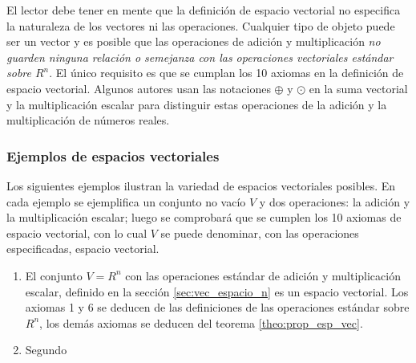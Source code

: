 \documentclass[a4paper,12pt]{article}
\begin{document}
El lector debe tener en mente que la definición de espacio vectorial no
especifica la naturaleza de los vectores ni las operaciones. Cualquier tipo de
objeto puede ser un vector y es posible que las operaciones de adición y
multiplicación \emph{no guarden ninguna relación o semejanza con las
operaciones vectoriales estándar sobre $R^n$}. El único requisito es que se
cumplan los 10 axiomas en la definición de espacio vectorial. Algunos autores
usan las notaciones $\oplus$ y $\odot$ en la suma vectorial y la
multiplicación escalar para distinguir estas operaciones de la adición y la
multiplicación de números reales.

\subsubsection{Ejemplos de espacios vectoriales}

Los siguientes ejemplos ilustran la variedad de espacios vectoriales posibles.
En cada ejemplo se ejemplifica un conjunto no vacío $V$ y dos operaciones: la
adición y la multiplicación escalar; luego se comprobará que se cumplen los 10
axiomas de espacio vectorial, con lo cual $V$ se puede denominar, con las
operaciones especificadas, espacio vectorial.

\begin{enumerate}[\textsc{Ejemplo} 1:, wide=\parindent]
  \item El conjunto $V=R^n$ con las operaciones estándar de adición y
    multiplicación escalar, definido en la sección \ref{sec:vec_espacio_n} es
    un espacio vectorial. Los axiomas 1 y 6 se deducen de las definiciones de
    las operaciones estándar sobre $R^n$, los demás axiomas se deducen del
    teorema \ref{theo:prop_esp_vec}.
  \item Segundo
\end{enumerate}
\end{document}
